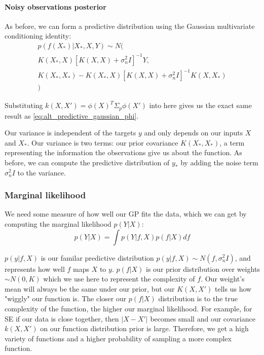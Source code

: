 \documentclass[10pt]{article}
\begin{document}
\paragraph{Noisy observations posterior}
As before, we can form a predictive distribution using the Gaussian multivariate conditioning identity:
\begin{equation*}
    \begin{aligned}
        p(f(X_*)|X_*, X, Y) \sim N( \\
        K(X_*,X)[K(X,X) + \sigma^2_nI]^{-1}Y, \\
        K(X_*,X_*) - K(X_*,X)[K(X,X) + \sigma^2_nI]^{-1}K(X,X_*) \\
        )
    \end{aligned}
\end{equation*}

Substituting $k(X,X') = \phi(X)^T\Sigma_p\phi(X')$ into here gives us the exact same result as \ref{eq:alt_predictive_gaussian_phi}.

Our variance is independent of the targets $y$ and only depends on our inputs $X$ and $X_*$. Our variance is two terms: our prior covariance $K(X_*,X_*)$, a term representing the information the observations give us about the function. As before, we can compute the predictive distribution of $y_*$ by adding the noise term $\sigma^2_nI$ to the variance.

\subsubsection{Marginal likelihood}
We need some measure of how well our GP fits the data, which we can get by computing the marginal likelihood $p(Y|X)$:
\begin{equation*}
    p(Y|X) = \int p(Y|f,X)p(f|X) df
\end{equation*}

$p(y|f,X)$ is our familar predictive distribution $p(y|f,X) \sim N(f, \sigma^2_nI)$, and represents how well $f$ maps $X$ to $y$. $p(f|X)$ is our prior distribution over weights $\sim N(0, K)$ which we use here to represent the complexity of $f$. Our weight's mean will always be the same under our prior, but our $K(X,X')$ tells us how "wiggly" our function is. The closer our $p(f|X)$ distribution is to the true complexity of the function, the higher our marginal likelihood. For example, for SE if our data is close together, then $|X - X'|$ becomes small and our covariance $k(X,X')$ on our function distribution prior is large. Therefore, we get a high variety of functions and a higher probability of sampling a more complex function. %
    
\end{document}
